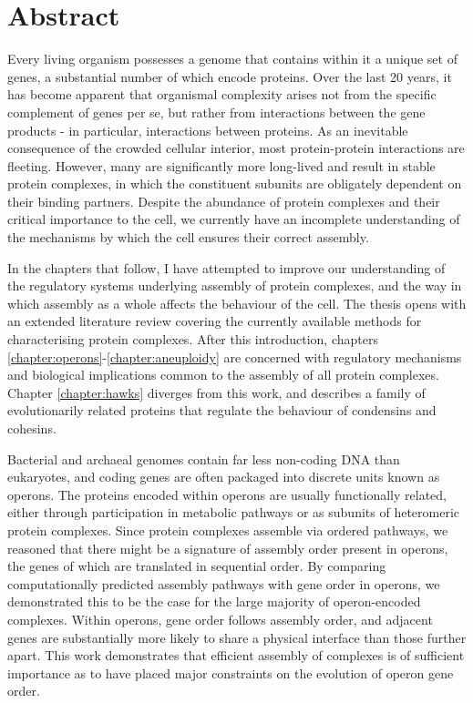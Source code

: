 \documentclass[a4paper,11pt,twoside,openright]{scrbook}
\begin{document}
\chapter*{Abstract}
Every living organism possesses a genome that contains within it a unique set of
genes, a substantial number of which encode proteins. Over the last 20 years, it
has become apparent that organismal complexity arises not from the specific
complement of genes per se, but rather from interactions between the gene
products - in particular, interactions between proteins. As an inevitable
consequence of the crowded cellular interior, most protein-protein interactions
are fleeting. However, many are significantly more long-lived and result in
stable protein complexes, in which the constituent subunits are obligately
dependent on their binding partners. Despite the abundance of protein complexes
and their critical importance to the cell, we currently have an incomplete
understanding of the mechanisms by which the cell ensures their correct
assembly.

In the chapters that follow, I have attempted to improve our understanding of
the regulatory systems underlying assembly of protein complexes, and the way in
which assembly as a whole affects the behaviour of the cell. The thesis opens
with an extended literature review covering the currently available methods for
characterising protein complexes. After this introduction, chapters
\ref*{chapter:operons}-\ref*{chapter:aneuploidy} are concerned with regulatory
mechanisms and biological implications common to the assembly of all protein
complexes. Chapter \ref{chapter:hawks} diverges from this work, and describes a
family of evolutionarily related proteins that regulate the behaviour of
condensins and cohesins.

Bacterial and archaeal genomes contain far less non-coding DNA than eukaryotes,
and coding genes are often packaged into discrete units known as operons. The
proteins encoded within operons are usually functionally related, either through
participation in metabolic pathways or as subunits of heteromeric protein
complexes. Since protein complexes assemble via ordered pathways, we reasoned
that there might be a signature of assembly order present in operons, the genes
of which are translated in sequential order. By comparing computationally
predicted assembly pathways with gene order in operons, we demonstrated this to
be the case for the large majority of operon-encoded complexes. Within operons,
gene order follows assembly order, and adjacent genes are substantially more
likely to share a physical interface than those further apart. This work
demonstrates that efficient assembly of complexes is of sufficient importance as
to have placed major constraints on the evolution of operon gene order.
\end{document}
